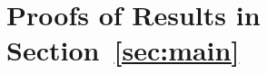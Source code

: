 \documentclass[journal]{IEEEtran}
\newcommand{\1}{\mathbf{1}}
\begin{document}
\section{Proofs of Results in Section~\ref{sec:main}}



\end{document}
